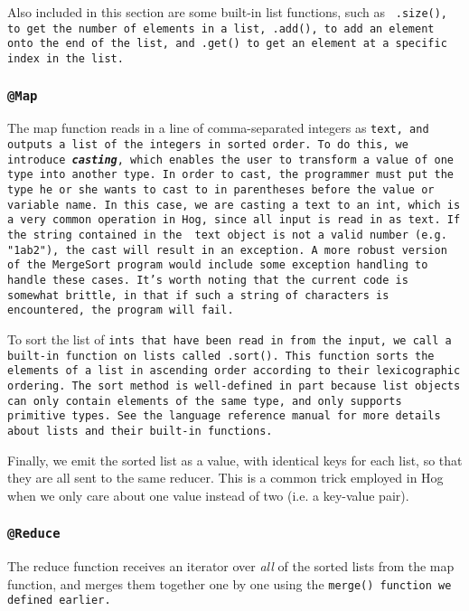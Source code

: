 \documentclass{article} \usepackage{fancyhdr, multicol}
\begin{document}
Also included in this section are some built-in list functions, such as \tt
.size()\rm, to get the number of elements in a list, \tt .add()\rm, to add an
element onto the end of the list, and \tt .get() \rm to get an element at a
specific index in the list.

\subsubsection*{\tt @Map \rm} 

The map function reads in a line of comma-separated integers as \tt text\rm, and
outputs a list of the integers in sorted order. To do this, we introduce
\textbf{\emph{casting}}, which enables the user to transform a value of one type
into another type. In order to cast, the programmer must put the type he or she
wants to cast to in parentheses before the value or variable name. In this case, we
are casting a \tt text \rm to an \tt int\rm, which is a very common operation in
Hog, since all input is read in as \tt text\rm. If the string contained in the \tt
text \rm object is not a valid number (e.g. \tt "1ab2"\rm), the cast will result in
an exception. A more robust version of the MergeSort program would include some
exception handling to handle these cases. It's worth noting that the current code
is somewhat brittle, in that if such a string of characters is encountered, the
program will fail.

To sort the list of \tt int\rm s that have been read in from the input, we call a
built-in function on lists called \tt.sort()\rm. This function sorts the elements
of a \tt list \rm in ascending order according to their lexicographic ordering. The
\tt sort \rm method is well-defined in part because \tt list \rm objects can only
contain elements of the same type, and only supports primitive types. See the
language reference manual for more details about \tt lists \rm and their built-in
functions.

Finally, we emit the sorted list as a value, with identical keys for each list, so
that they are all sent to the same reducer. This is a common trick employed in Hog
when we only care about one value instead of two (i.e. a key-value pair).

\subsubsection*{\tt @Reduce \rm}

The reduce function receives an iterator over \emph{all} of the sorted lists from
the map function, and merges them together one by one using the \tt merge() \rm
function we defined earlier.
\end{document}
